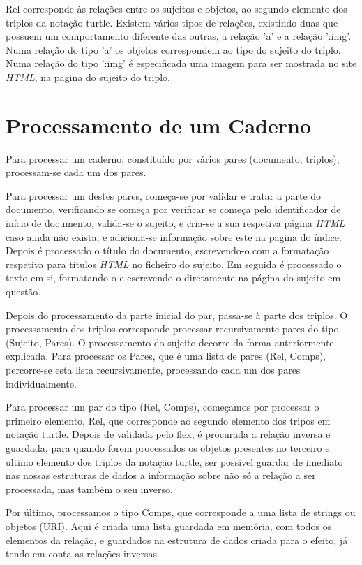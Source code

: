 \documentclass[a4paper]{report}
\begin{document}
Rel corresponde às relações entre os sujeitos e objetos, ao segundo elemento dos
triplos da notação turtle. Existem vários tipos de relações, existindo duas que
possuem um comportamento diferente das outras, a relação 'a' e a relação ':img'.
Numa relação do tipo 'a' os objetos correspondem ao tipo do sujeito do triplo.
Numa relação do tipo ':img' é especificada uma imagem para ser mostrada no site
\textit{HTML}, na pagina do sujeito do triplo.

\section{Processamento de um Caderno}

Para processar um caderno, constituído por vários pares (documento, triplos),
processam-se cada um dos pares.

Para processar um destes pares, começa-se por validar e tratar a parte do
documento, verificando se começa por verificar se começa pelo identificador de
início de documento, valida-se o sujeito, e cria-se a sua respetiva página
\textit{HTML} caso ainda não exista, e adiciona-se informação sobre este na
pagina do índice. Depois é processado o título do documento, escrevendo-o com a
formatação respetiva para títulos \textit{HTML} no ficheiro do sujeito. Em
seguida é processado o texto em si, formatando-o e escrevendo-o diretamente na
página do sujeito em questão.

Depois do processamento da parte inicial do par, passa-se à parte dos triplos.
O processamento dos triplos corresponde processar recursivamente pares do tipo
(Sujeito, Pares). O processamento do sujeito decorre da forma anteriormente
explicada. Para processar os Pares, que é uma lista de pares (Rel, Comps),
percorre-se esta lista recursivamente, processando cada um dos pares
individualmente.

Para processar um par do tipo (Rel, Comps), começamos por processar o primeiro
elemento, Rel, que corresponde ao segundo elemento dos tripos em notação turtle.
Depois de validada pelo flex, é procurada a relação inversa e guardada, para
quando forem processados os objetos presentes no terceiro e ultimo elemento dos
triplos da notação turtle, ser possível guardar de imediato nas nossas 
estruturas de dados a informação sobre não só a relação a ser processada, mas
também o seu inverso.

Por último, processamos o tipo Comps, que corresponde a uma lista de strings ou
objetos (URI). Aqui é criada uma lista guardada em memória, com todos os
elementos da relação, e guardados na estrutura de dados criada para o efeito,
já tendo em conta as relações inversas.
\end{document}
